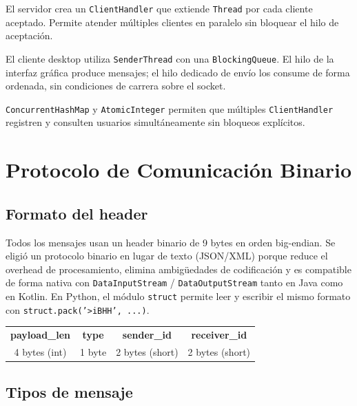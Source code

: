 \documentclass[12pt,a4paper]{article}
\begin{document}
\begin{description}[leftmargin=2.5cm,labelwidth=2.5cm]
  \item[Thread-per-Connection] El servidor crea un \texttt{ClientHandler} que
    extiende \texttt{Thread} por cada cliente aceptado. Permite atender
    múltiples clientes en paralelo sin bloquear el hilo de aceptación.
  \item[Producer-Consumer] El cliente desktop utiliza \texttt{SenderThread}
    con una \texttt{BlockingQueue}. El hilo de la interfaz gráfica produce
    mensajes; el hilo dedicado de envío los consume de forma ordenada, sin
    condiciones de carrera sobre el socket.
  \item[Thread-safe Registry] \texttt{ConcurrentHashMap} y \texttt{AtomicInteger}
    permiten que múltiples \texttt{ClientHandler} registren y consulten usuarios
    simultáneamente sin bloqueos explícitos.
\end{description}

\section{Protocolo de Comunicación Binario}

\subsection{Formato del header}

Todos los mensajes usan un header binario de 9 bytes en orden big-endian.
Se eligió un protocolo binario en lugar de texto (JSON/XML) porque reduce
el overhead de procesamiento, elimina ambigüedades de codificación y es
compatible de forma nativa con \texttt{DataInputStream} / \texttt{DataOutputStream}
tanto en Java como en Kotlin. En Python, el módulo \texttt{struct} permite
leer y escribir el mismo formato con \texttt{struct.pack('>iBHH', ...)}.

\begin{center}
\begin{tabular}{|c|c|c|c|}
\hline
\textbf{payload\_len} & \textbf{type} & \textbf{sender\_id} & \textbf{receiver\_id} \\
4 bytes (int) & 1 byte & 2 bytes (short) & 2 bytes (short) \\
\hline
\end{tabular}
\end{center}

\subsection{Tipos de mensaje}
\end{document}
